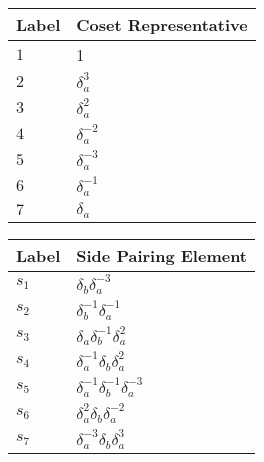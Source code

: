 \documentclass{article}
\begin{document}
\begin{center}
\begin{tabular}{ll}
\toprule
Label & Coset Representative\\
\midrule
$1$ & 1 \\
$2$ & $\delta_a^{3}$ \\
$3$ & $\delta_a^{2}$ \\
$4$ & $\delta_a^{-2}$ \\
$5$ & $\delta_a^{-3}$ \\
$6$ & $\delta_a^{-1}$ \\
$7$ & $\delta_a^{}$ \\
\bottomrule
\end{tabular}
\hfill
\begin{tabular}{ll}
\toprule
Label & Side Pairing Element\\
\midrule
$s_{1}$ & $\delta_b^{}\delta_a^{-3}$ \\
$s_{2}$ & $\delta_b^{-1}\delta_a^{-1}$ \\
$s_{3}$ & $\delta_a^{}\delta_b^{-1}\delta_a^{2}$ \\
$s_{4}$ & $\delta_a^{-1}\delta_b^{}\delta_a^{2}$ \\
$s_{5}$ & $\delta_a^{-1}\delta_b^{-1}\delta_a^{-3}$ \\
$s_{6}$ & $\delta_a^{2}\delta_b^{}\delta_a^{-2}$ \\
$s_{7}$ & $\delta_a^{-3}\delta_b^{}\delta_a^{3}$ \\
\bottomrule
\end{tabular}
\end{center}

\thispagestyle{empty}
\end{document}
